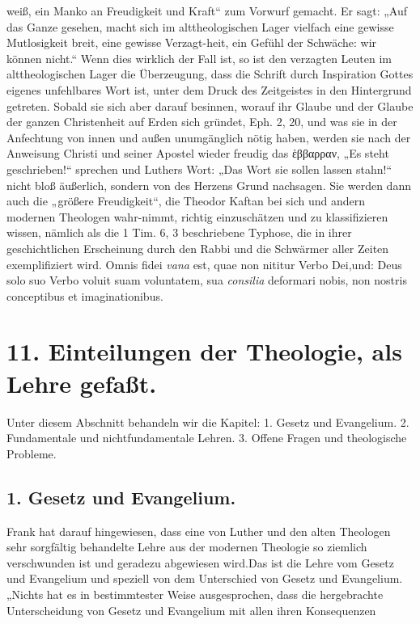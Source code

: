 weiß, ein Manko an Freudigkeit und Kraft“ zum Vorwurf gemacht. Er sagt: „Auf das Ganze gesehen, macht sich im alttheologischen Lager vielfach eine gewisse Mutlosigkeit breit, eine gewisse Verzagt-heit, ein Gefühl der Schwäche: wir können nicht.“ Wenn dies wirklich der Fall ist, so ist den verzagten Leuten im alttheologischen Lager die Überzeugung, dass die Schrift durch Inspiration Gottes eigenes unfehlbares Wort ist, unter dem Druck des Zeitgeistes in den Hintergrund getreten. Sobald sie sich aber darauf besinnen, worauf ihr Glaube und der Glaube der ganzen Christenheit auf Erden sich gründet, Eph. 2, 20, und was sie in der Anfechtung von innen und außen unumgänglich nötig haben, werden sie nach der Anweisung Christi und seiner Apostel wieder freudig das \foreignlanguage{greek}{ἑββαρραν}, „Es steht geschrieben!“ sprechen und Luthers Wort: „Das Wort sie sollen lassen stahn!“ nicht bloß äußerlich, sondern von des Herzens Grund nachsagen. Sie werden dann auch die „größere Freudigkeit“, die Theodor Kaftan bei sich und andern modernen Theologen wahr-nimmt, richtig einzuschätzen und zu klassifizieren wissen, nämlich als die 1 Tim. 6, 3 beschriebene Typhose, die in ihrer geschichtlichen Erscheinung durch den Rabbi und die Schwärmer aller Zeiten exemplifiziert wird. Omnis fidei \textit{vana} est, quae non nititur Verbo Dei,\footnotemark[276] und: Deus solo suo Verbo voluit suam voluntatem, sua \textit{consilia} deformari nobis, non nostris conceptibus et imaginationibus.\footnotemark[277]

\section*{11. Einteilungen der Theologie, als Lehre gefaßt.}

Unter diesem Abschnitt behandeln wir die Kapitel: 1. Gesetz und Evangelium. 2. Fundamentale und nichtfundamentale Lehren. 3. Offene Fragen und theologische Probleme.

\subsection*{1. Gesetz und Evangelium.}

Frank hat darauf hingewiesen, dass eine von Luther und den alten Theologen sehr sorgfältig behandelte Lehre aus der modernen Theologie so ziemlich verschwunden ist und geradezu abgewiesen wird.\footnotemark[278] Das ist die Lehre vom Gesetz und Evangelium und speziell von dem Unterschied von Gesetz und Evangelium. „Nichts hat es in bestimmtester Weise ausgesprochen, dass die hergebrachte Unterscheidung von Gesetz und Evangelium mit allen ihren Konsequenzen

\begin{footnotesize}
\end{footnotesize}